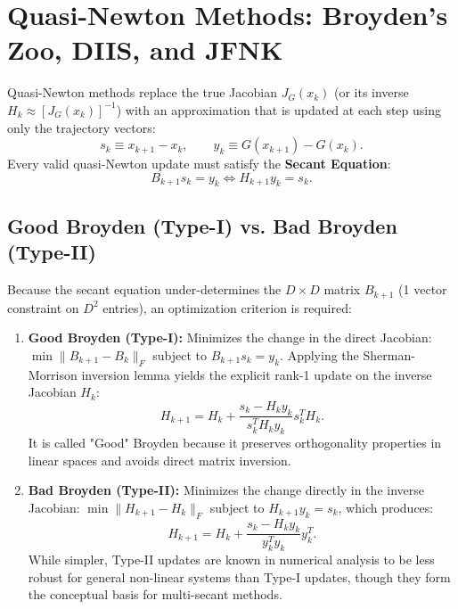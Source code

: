 \section{Quasi-Newton Methods: Broyden's Zoo, DIIS, and JFNK}
\label{sec:m1_6_quasi_newton_zoo}

Quasi-Newton methods replace the true Jacobian $J_G(x_k)$ (or its inverse $H_k \approx [J_G(x_k)]^{-1}$) with an approximation that is updated at each step using only the trajectory vectors:
\begin{equation}
s_k \equiv x_{k+1} - x_k, \qquad y_k \equiv G(x_{k+1}) - G(x_k).
\end{equation}
Every valid quasi-Newton update must satisfy the \textbf{Secant Equation}:
\begin{equation}
B_{k+1} s_k = y_k \iff H_{k+1} y_k = s_k.
\end{equation}

\subsection{Good Broyden (Type-I) vs. Bad Broyden (Type-II)}
Because the secant equation under-determines the $D \times D$ matrix $B_{k+1}$ (1 vector constraint on $D^2$ entries), an optimization criterion is required:
\begin{enumerate}
\item \textbf{Good Broyden (Type-I):} Minimizes the change in the direct Jacobian: $\min \|B_{k+1} - B_k\|_F$ subject to $B_{k+1} s_k = y_k$. Applying the Sherman-Morrison inversion lemma yields the explicit rank-1 update on the inverse Jacobian $H_k$:
\begin{equation}
\label{eq:m1_6_good_broyden_def}
H_{k+1} = H_k + \frac{s_k - H_k y_k}{s_k^T H_k y_k} s_k^T H_k.
\end{equation}
It is called "Good" Broyden because it preserves orthogonality properties in linear spaces and avoids direct matrix inversion.
\item \textbf{Bad Broyden (Type-II):} Minimizes the change directly in the inverse Jacobian: $\min \|H_{k+1} - H_k\|_F$ subject to $H_{k+1} y_k = s_k$, which produces:
\begin{equation}
\label{eq:m1_6_bad_broyden_def}
H_{k+1} = H_k + \frac{s_k - H_k y_k}{y_k^T y_k} y_k^T.
\end{equation}
While simpler, Type-II updates are known in numerical analysis to be less robust for general non-linear systems than Type-I updates, though they form the conceptual basis for multi-secant methods.
\end{enumerate}

